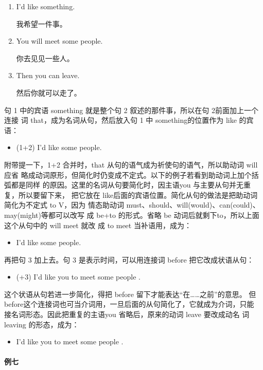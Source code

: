 \begin{enumerate}
\item   I'd like something.

  我希望一件事。
\item   You will meet some people.

  你去见见一些人。
\item   Then you can leave.

  然后你就可以走了。
\end{enumerate}

句 1 中的宾语 something 就是整个句 2 叙述的那件事，所以在句 2前面加上一个连接
词 that，成为名词从句，然后放入句 1 中 something的位置作为 like 的宾语：
\begin{itemize}
\item (1+2) I'd like  some people.
\end{itemize}
附带提一下，1+2 合并时，that 从句的语气成为祈使句的语气，所以助动词 will应省
略成动词原形，但简化时仍变成不定式。以下的例子若看到助动词上加个括弧都是同样
的原因。这里的名词从句要简化时，因主语you 与主要从句并无重复，所以要留下来，
把它放在 like后面的宾语位置。简化从句的做法是把助动词简化为不定式 to V，因为
情态助动词 must、should、will(would)、can(could)、 may(might)等都可以改写
成 be+to 的形式。省略 be 动词后就剩下to，所以上面这个从句中的 will meet 就改
成 to meet 当补语用，成为：
\begin{itemize}
\item I'd like  some people.
\end{itemize}
再把句 3 加上去。句 3 是表示时间，可以用连接词 before 把它改成状语从句：
\begin{itemize}
\item (+3) I'd like you to meet some people .
\end{itemize}
这个状语从句若进一步简化，得把 before 留下才能表达“在……之前”的意思。
但 before这个连接词也可当介词用，一旦后面的从句简化了，它就成为介词，只能
接名词形态。因此把重复的主语you 省略后，原来的动词 leave 要改成动名
词 leaving 的形态，成为：
\begin{itemize}
\item I'd like you to meet some people .
\end{itemize}

\paragraph{例七}

